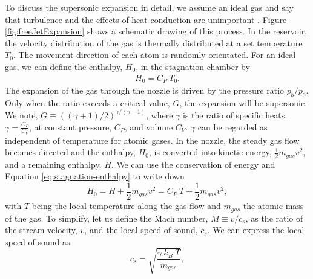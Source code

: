 %
To discuss the supersonic expansion in detail, we assume an ideal gas and say that turbulence and the effects of heat conduction are unimportant \citep{Yamada-2001-SciDir,Haberland-1994-Springer}. Figure \ref{fig:freeJetExpansion} shows a schematic drawing of this process. In the reservoir, the velocity distribution of the gas is thermally distributed at a set temperature $T_{0}$. The movement direction of each atom is randomly orientated. For an ideal gas, we can define the enthalpy, $H_{0}$, in the stagnation chamber by
\begin{align}
H_{0}=C_{P}\ T_{0}.
\label{eq:stagnation-enthalpy}
\end{align}
The expansion of the gas through the nozzle is driven by the pressure ratio $p_{b}/p_{0}$. Only when the ratio exceeds a critical value, $G$, the expansion will be supersonic. We note, $G\equiv \left(\left(\gamma + 1\right)/2\right)^{\gamma/\left(\gamma - 1\right)}$, where $\gamma$ is the ratio of specific heats, $\gamma = \tfrac{C_{P}}{C_{V}}$, at constant pressure, $C_{P}$, and volume $C_{V}$. $\gamma$ can be regarded as independent of temperature for atomic gases. In the nozzle, the steady gas flow becomes directed and the enthalpy, $H_{0}$, is converted into kinetic energy, $\tfrac{1}{2}m_{gas} v^{2}$, and a remaining enthalpy, $H$. We can use the conservation of energy and Equation \eqref{eq:stagnation-enthalpy} to write down
\begin{equation}
H_{0}=H+\frac{1}{2}m_{gas} v^{2} = C_{P}\ T+\frac{1}{2}m_{gas}v^{2},
\label{eq:local-temperature}
\end{equation}
with $T$ being the local temperature along the gas flow and $m_{gas}$ the atomic mass of the gas. To simplify, let us define the Mach number, $M\equiv v/c_{s}$, as the ratio of the stream velocity, $v$, and the local speed of sound, $c_{s}$. We can express the local speed of sound as
\begin{equation}
c_{s}=\sqrt{\frac{\gamma\ k_{B}\ T}{m_{gas}}},
\label{eq:local-speed-of-sound}
\end{equation}
